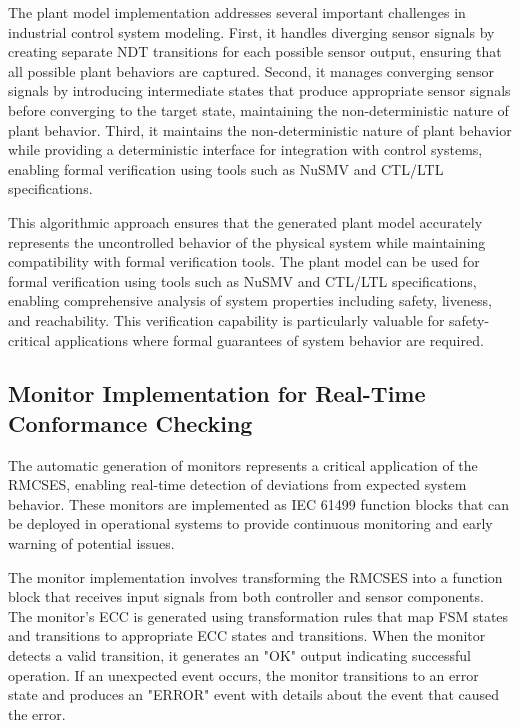 The plant model implementation addresses several important challenges in industrial control system modeling. First, it handles diverging sensor signals by creating separate NDT transitions for each possible sensor output, ensuring that all possible plant behaviors are captured. Second, it manages converging sensor signals by introducing intermediate states that produce appropriate sensor signals before converging to the target state, maintaining the non-deterministic nature of plant behavior. Third, it maintains the non-deterministic nature of plant behavior while providing a deterministic interface for integration with control systems, enabling formal verification using tools such as NuSMV and CTL/LTL specifications.

This algorithmic approach ensures that the generated plant model accurately represents the uncontrolled behavior of the physical system while maintaining compatibility with formal verification tools. The plant model can be used for formal verification using tools such as NuSMV and CTL/LTL specifications, enabling comprehensive analysis of system properties including safety, liveness, and reachability. This verification capability is particularly valuable for safety-critical applications where formal guarantees of system behavior are required.

\subsection{Monitor Implementation for Real-Time Conformance Checking}

The automatic generation of monitors represents a critical application of the RMCSES, enabling real-time detection of deviations from expected system behavior. These monitors are implemented as IEC 61499 function blocks that can be deployed in operational systems to provide continuous monitoring and early warning of potential issues.

The monitor implementation involves transforming the RMCSES into a function block that receives input signals from both controller and sensor components. The monitor's ECC is generated using transformation rules that map FSM states and transitions to appropriate ECC states and transitions. When the monitor detects a valid transition, it generates an "OK" output indicating successful operation. If an unexpected event occurs, the monitor transitions to an error state and produces an "ERROR" event with details about the event that caused the error.

